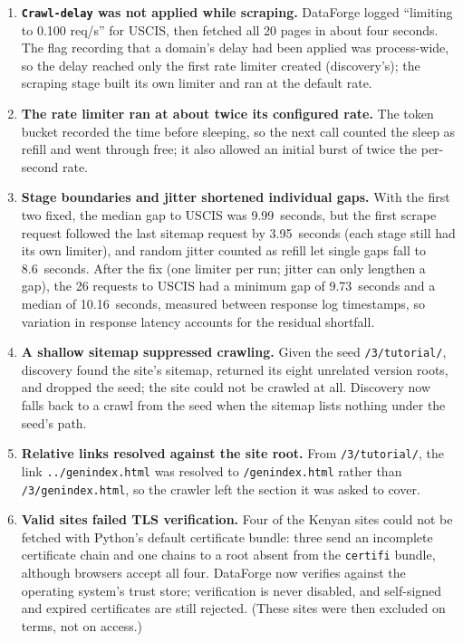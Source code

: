 \documentclass[11pt]{article}
\begin{document}
\begin{enumerate}[leftmargin=1.5em]
  \item \textbf{\texttt{Crawl-delay} was not applied while scraping.}
    DataForge logged ``limiting to 0.100 req/s'' for USCIS, then fetched
    all 20 pages in about four seconds. The flag recording that a domain's
    delay had been applied was process-wide, so the delay reached only the
    first rate limiter created (discovery's); the scraping stage built its
    own limiter and ran at the default rate.
  \item \textbf{The rate limiter ran at about twice its configured rate.}
    The token bucket recorded the time before sleeping, so the next call
    counted the sleep as refill and went through free; it also allowed an
    initial burst of twice the per-second rate.
  \item \textbf{Stage boundaries and jitter shortened individual gaps.}
    With the first two fixed, the median gap to USCIS was 9.99~seconds,
    but the first scrape request followed the last sitemap request by
    3.95~seconds (each stage still had its own limiter), and random jitter
    counted as refill let single gaps fall to 8.6~seconds. After the fix
    (one limiter per run; jitter can only lengthen a gap), the 26 requests
    to USCIS had a minimum gap of 9.73~seconds and a median of
    10.16~seconds, measured between response log timestamps, so variation
    in response latency accounts for the residual shortfall.
  \item \textbf{A shallow sitemap suppressed crawling.} Given the seed
    \texttt{/3/tutorial/}, discovery found the site's sitemap, returned its
    eight unrelated version roots, and dropped the seed; the site could
    not be crawled at all. Discovery now falls back to a crawl from the
    seed when the sitemap lists nothing under the seed's path.
  \item \textbf{Relative links resolved against the site root.} From
    \texttt{/3/tutorial/}, the link \texttt{../genindex.html} was resolved
    to \texttt{/genindex.html} rather than \texttt{/3/genindex.html}, so
    the crawler left the section it was asked to cover.
  \item \textbf{Valid sites failed TLS verification.} Four of the Kenyan
    sites could not be fetched with Python's default certificate bundle:
    three send an incomplete certificate chain and one chains to a root
    absent from the \texttt{certifi} bundle, although browsers accept all
    four. DataForge now verifies against the operating system's trust
    store; verification is never disabled, and self-signed and expired
    certificates are still rejected. (These sites were then excluded on
    terms, not on access.)
\end{enumerate}
\end{document}
